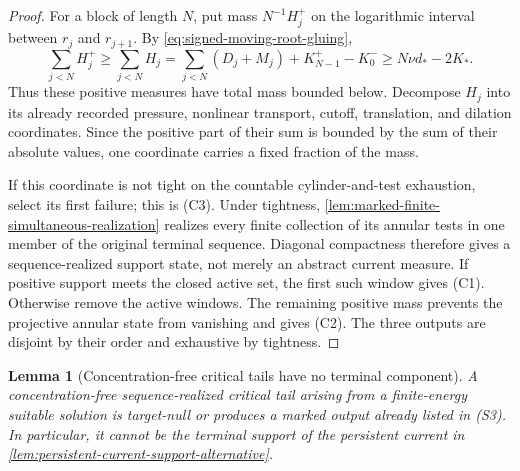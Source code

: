 \documentclass[11pt]{amsart}
\numberwithin{equation}{section}
\theoremstyle{plain}
\newtheorem{lemma}[lemma]{Lemma}
\theoremstyle{definition}
\theoremstyle{remark}
\begin{document}
\begin{proof}
For a block of length \(N\), put mass \(N^{-1}H_j^+\) on the logarithmic
interval between \(r_j\) and \(r_{j+1}\).  By
\eqref{eq:signed-moving-root-gluing},
\[
 \sum_{j<N}H_j^+
 \ge\sum_{j<N}H_j
 =\sum_{j<N}(D_j+M_j)+K_{N-1}^+-K_0^-
 \ge N\nu d_*-2K_*.
\]
Thus these positive measures have total mass bounded below.  Decompose
\(H_j\) into its already recorded pressure, nonlinear transport, cutoff,
translation, and dilation coordinates.  Since the positive part of their sum
is bounded by the sum of their absolute values, one coordinate carries a
fixed fraction of the mass.

If this coordinate is not tight on the countable cylinder-and-test
exhaustion, select its first failure; this is \textup{(C3)}.  Under tightness,
\cref{lem:marked-finite-simultaneous-realization} realizes every finite
collection of its annular tests in one member of the original terminal
sequence.  Diagonal compactness therefore gives a sequence-realized support
state, not merely an abstract current measure.  If positive support meets the
closed active set, the first such window gives \textup{(C1)}.  Otherwise
remove the active windows.  The remaining positive mass prevents the
projective annular state from vanishing and gives \textup{(C2)}.  The three
outputs are disjoint by their order and exhaustive by tightness.
\end{proof}

\begin{lemma}[Concentration-free critical tails have no terminal component]
\label{lem:concentration-free-tail-closure}
A concentration-free sequence-realized critical tail arising from a
finite-energy suitable solution is target-null or produces a marked output
already listed in \textup{(S3)}.  In particular, it cannot be the terminal
support of the persistent current in
\cref{lem:persistent-current-support-alternative}.
\end{lemma}
\end{document}
